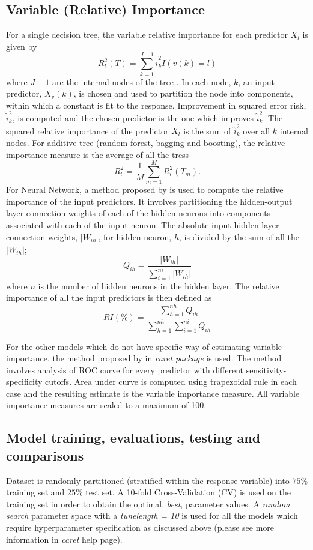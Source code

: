 \subsection{Variable (Relative) Importance}

For a single decision tree, the variable relative importance for each predictor $X_l$ is given by
\[
R^2_{l}(T) = \sum^{J-1}_{k=1}\hat{i}^2_kI(v(k) = l)
\]
where $J-1$ are the internal nodes of the tree \cite{trevor2009elements}. In each node, $k$, an input predictor, $X_v(k)$, is chosen and used to partition the node into components, within which a constant is fit to the response. Improvement in squared error risk, $\hat{i}^2_k$, is computed and the chosen predictor is the one which improves $\hat{i}^2_k$. The squared relative importance of the predictor $X_l$ is the sum of $\hat{i}^2_k$ over all $k$ internal nodes. For additive tree (random forest, bagging and boosting), the relative importance measure is the average of all the tress
\[
R^2_{l} = \frac{1}{M}\sum^M_{m=1}R^2_{l}(T_m).
\]
For Neural Network, a method proposed by \citet{gevrey2003review} is used to compute the relative importance of the input predictors. It involves partitioning the hidden-output layer connection weights of each of the hidden neurons into components associated with each of the input neuron. The absolute input-hidden layer connection weights, $|W_{ih|}$, for hidden neuron, $h$, is divided by the sum of all the $|W_{ih}|$;
\[
Q_{ih} = \frac{|W_{ih}|}{\sum^{ni}_{i=1}|W_{ih}|}
\]
where $n$ is the number of hidden neurons in the hidden layer. The relative importance of all the input predictors is then defined as
\[
RI(\%) = \frac{\sum^{nh}_{h=1}Q_{ih}}{\sum^{nh}_{h=1}\sum^{ni}_{i=1}Q_{ih}}
\]

\noindent For the other models which do not have specific way of estimating variable importance, the method proposed by \citet{caretpackage} in \textit{caret package} is used. The method involves analysis of ROC curve for every predictor with different sensitivity-specificity cutoffs. Area under curve is computed using trapezoidal rule in each case and the resulting estimate is the variable importance measure. All variable importance measures are scaled to a maximum of 100.

\subsection{Model training, evaluations, testing and comparisons}

Dataset is randomly partitioned (stratified within the response variable) into $75\%$ training set and $25\%$ test set. A 10-fold Cross-Validation (CV) is used on the training set in order to obtain the optimal, \textit{best}, parameter values. A \textit{random search} parameter space with a \textit{tunelength = 10} is used for all the models which require hyperparameter specification as discussed above (please see more information in \textit{caret} help page). \\

